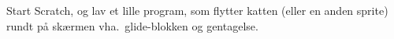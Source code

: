 Start Scratch, og lav et lille program, som flytter katten (eller en anden sprite) rundt på skærmen vha.\ glide-blokken og gentagelse.
